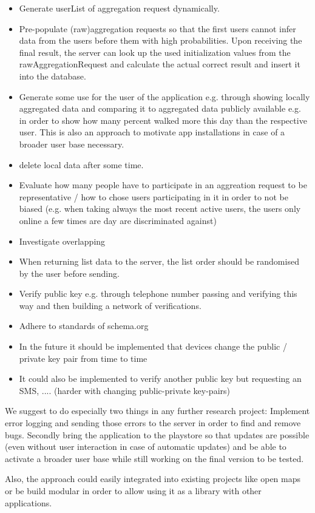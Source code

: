 \begin{itemize}
	\item Generate userList of aggregation request dynamically.
	\item Pre-populate (raw)aggregation requests so that the first users cannot infer data from the users before them with high probabilities. Upon receiving the final result, the server can look up the used initialization values from the rawAggregationRequest and calculate the actual correct result and insert it into the database.
	\item Generate some use for the user of the application e.g. through showing locally aggregated data and comparing it to aggregated data publicly available e.g. in order to show how many percent walked more this day than the respective user. This is also an approach to motivate app installations in case of a broader user base necessary.
	\item delete local data after some time.
	\item Evaluate how many people have to participate in an aggreation request to be representative / how to chose users participating in it in order to not be biased (e.g. when taking always the most recent active users, the users only online a few times are day are discriminated against)
	\item Investigate overlapping
	\item When returning list data to the server, the list order should be randomised by the user before sending.
	\item Verify public key e.g. through telephone number passing and verifying this way and then building a network of verifications.
	\item Adhere to standards of schema.org
	\item In the future it should be implemented that devices change the public / private key pair from time to time
	\item It could also be implemented to verify another public key but requesting an SMS, .... (harder with changing public-private key-pairs)
\end{itemize}
We suggest to do especially two things in any further research project: Implement error logging and sending those errors to the server in order to find and remove bugs. Secondly bring the application to the playstore so that updates are possible (even without user interaction in case of automatic updates) and be able to activate a broader user base while still working on the final version to be tested.

Also, the approach could easily integrated into existing projects like open maps or be build modular in order to allow using it as a library with other applications.